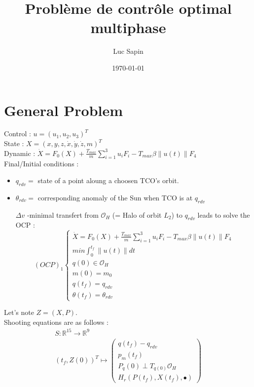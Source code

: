 \documentclass[fleqn,%
a4paper,11pt]{scrbook}
\title{Problème de contrôle optimal multiphase }
\author{Luc Sapin}
\date{\today}
\begin{document}
\maketitle
\section{General Problem}

Control : $u = (u_1, u_2, u_3)^T $ \\
State   : $X = (x, y, z, \dot{x}, \dot{y}, \dot{z}, m)^T $ \\
Dynamic : $\dot{X} = F_0(X) + \frac{T_{max}}{m} \sum_{i=1}^{3} u_i F_i  - T_{max} \beta \|u(t)\| F_4 $ \\

Final/Initial conditions :
\begin{itemize}
	\item $q_{rdv} = $ state of a point aloung a choosen TCO's orbit.
	\item $\theta_{rdv} = $ corresponding anomaly of the Sun when TCO is at $q_{rdv}$
	
	$\Delta v$ -minimal transfert from $\mathcal{O}_H$ (= Halo of orbit $L_2$) to $q_{rdv}$ leads to solve the OCP :
	$$
	(OCP)_1 \left\{
	\begin{array}{l}
        \dot{X} = F_0(X) + \frac{T_{max}}{m} \sum_{i=1}^{3} u_i F_i  - T_{max} \beta \|u(t)\| F_4 \\
        min \displaystyle \int_0^{t_f} \|u(t)\| dt \\
        q(0) \in \mathcal{O}_H \\
        m(0) = m_0 \\
        q(t_f) = q_{rdv} \\
        \theta(t_f) = \theta_{rdv}
    \end{array}
	\right.$$
\end{itemize}

Let's note $Z = (X, P)$. \\ Shooting equations are as follows :
$$
\begin{array}{l}
	S : \mathbb{R}^{15} \rightarrow \mathbb{R}^9 \\
	(t_f, Z(0))^T \mapsto \left(
							\begin{array}{c}
							q(t_f) - q_{rdv} \\
							p_m(t_f) \\
							P_q(0) \perp T_{q(0)} \mathcal{O}_H \\
							H_r(P(t_f), X(t_f), \bullet)
							\end{array}
						  \right)
\end{array}
$$
\end{document}
